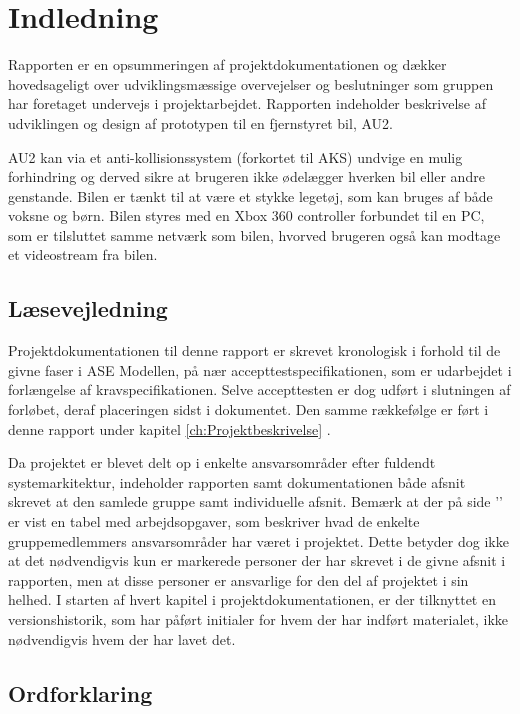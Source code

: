 \chapter{Indledning}
\label{ch:Indledning}
Rapporten er en opsummeringen af projektdokumentationen og dækker hovedsageligt over udviklingsmæssige overvejelser og beslutninger som gruppen har foretaget undervejs i projektarbejdet. 
Rapporten indeholder beskrivelse af udviklingen og design af prototypen til en fjernstyret bil, AU2.

AU2 kan via et anti-kollisionssystem (forkortet til AKS) undvige en mulig forhindring og derved sikre at brugeren ikke ødelægger hverken bil eller andre genstande. 
Bilen er tænkt til at være et stykke legetøj, som kan bruges af både voksne og børn. 
Bilen styres med en Xbox 360 controller forbundet til en PC, som er tilsluttet samme netværk som bilen, hvorved brugeren også kan modtage et videostream fra bilen.


\section{Læsevejledning}
Projektdokumentationen til denne rapport er skrevet kronologisk i forhold til de givne faser i ASE Modellen\cite{lib:vejledning}, på nær accepttestspecifikationen, som er udarbejdet i forlængelse af kravspecifikationen. 
Selve accepttesten er dog udført i slutningen af forløbet, deraf placeringen sidst i dokumentet.
Den samme rækkefølge er ført i denne rapport under kapitel \ref{ch:Projektbeskrivelse} .

Da projektet er blevet delt op i enkelte ansvarsområder efter fuldendt systemarkitektur, indeholder rapporten samt dokumentationen både afsnit skrevet at den samlede gruppe samt individuelle afsnit.
Bemærk at der på side '\pageref{ch:arbejdsopgaver}' er vist en tabel med arbejdsopgaver, som beskriver hvad de enkelte gruppemedlemmers ansvarsområder har været i projektet. 
Dette betyder dog ikke at det nødvendigvis kun er markerede personer der har skrevet i de givne afsnit i rapporten, men at disse personer er ansvarlige for den del af projektet i sin helhed.
I starten af hvert kapitel i projektdokumentationen, er der tilknyttet en versionshistorik, som har påført initialer for hvem der har indført materialet, ikke nødvendigvis hvem der har lavet det.

\clearpage

\section{Ordforklaring}


